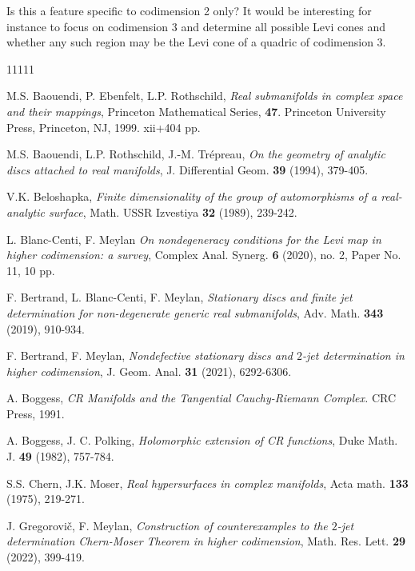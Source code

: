 \documentclass[12pt]{amsart}
\theoremstyle{remark}
\theoremstyle{example}
\theoremstyle{definition}
\numberwithin{equation}{section}
\begin{document}
\vspace{0.1cm}
Is this a feature specific to  codimension 2 only? It would  be interesting for instance to focus on codimension $3$ and 
determine all possible Levi cones and whether any such region may be the Levi cone of a quadric of codimension 3.       







\begin{thebibliography}{11111}

M.S. Baouendi, P. Ebenfelt, L.P. Rothschild, {\it Real submanifolds in complex space and their mappings}, 
Princeton Mathematical Series, {\bf 47}. Princeton University Press, Princeton, NJ, 1999. xii+404 pp.
  
  M.S. Baouendi, L.P. Rothschild, J.-M. Tr\' epreau,   {\it On the geometry of analytic discs attached to real manifolds}, 
J. Differential Geom.  \textbf{39} (1994),   379-405.  

 V.K. Beloshapka, {\it Finite dimensionality of the group of automorphisms of a real-analytic surface},  Math. USSR Izvestiya {\bf 32} (1989), 239-242.

 L. Blanc-Centi, F. Meylan {\it On nondegeneracy conditions for the Levi map in higher codimension: a survey}, Complex Anal. Synerg. {\bf 6} (2020), 
no. 2, Paper No. 11, 10 pp.

 F. Bertrand, L. Blanc-Centi, F. Meylan, {\it Stationary discs and finite jet determination for non-degenerate generic real 
submanifolds}, Adv. Math. {\bf 343} (2019), 910-934. 

 F. Bertrand, F. Meylan, {\it Nondefective stationary discs and $2$-jet  determination in higher codimension},  
J. Geom. Anal. {\bf 31} (2021), 6292-6306.

 A. Boggess, {\it CR Manifolds and the Tangential Cauchy-Riemann Complex.} CRC Press, 1991.

 A. Boggess, J. C. Polking, {\it Holomorphic extension of CR functions}, Duke Math. J. {\bf 49} (1982), 757-784.

  S.S. Chern, J.K. Moser, {\it Real hypersurfaces in complex manifolds},  Acta math. {\bf 133} (1975), 219-271.


 J. Gregorovi\v c, F. Meylan, {\it  Construction of counterexamples to the $2$-jet determination Chern-Moser Theorem 
in higher codimension}, Math. Res. Lett. {\bf 29} (2022), 399-419.
 


\end{thebibliography}
\end{document}
